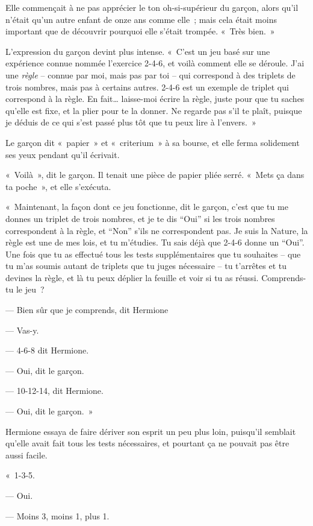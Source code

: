 Elle commençait à ne pas apprécier le ton oh-si-supérieur du garçon, alors qu'il n'était qu'un autre enfant de onze ans comme elle~; mais cela était moins important que de découvrir pourquoi elle s'était trompée. «~Très bien.~»

L'expression du garçon devint plus intense. «~C'est un jeu basé sur une expérience connue nommée l'exercice 2-4-6, et voilà comment elle se déroule. J'ai une \emph{règle} -- connue par moi, mais pas par toi -- qui correspond à des triplets de trois nombres, mais pas à certains autres. 2-4-6 est un exemple de triplet qui correspond à la règle. En fait… laisse-moi écrire la règle, juste pour que tu saches qu'elle est fixe, et la plier pour te la donner. Ne regarde pas s'il te plaît, puisque je déduis de ce qui s'est passé plus tôt que tu peux lire à l'envers.~»

Le garçon dit «~papier~» et «~criterium~» à sa bourse, et elle ferma solidement ses yeux pendant qu'il écrivait.

«~Voilà~», dit le garçon. Il tenait une pièce de papier pliée serré. «~Mets ça dans ta poche~», et elle s'exécuta.

«~Maintenant, la façon dont ce jeu fonctionne, dit le garçon, c'est que tu me donnes un triplet de trois nombres, et je te dis “Oui” si les trois nombres correspondent à la règle, et “Non” s'ils ne correspondent pas. Je suis la Nature, la règle est une de mes lois, et tu m'étudies. Tu sais déjà que 2-4-6 donne un “Oui”. Une fois que tu as effectué tous les tests supplémentaires que tu souhaites -- que tu m'as soumis autant de triplets que tu juges nécessaire -- tu t'arrêtes et tu devines la règle, et là tu peux déplier la feuille et voir si tu as réussi. Comprends-tu le jeu~?

--- Bien sûr que je comprends, dit Hermione

--- Vas-y.

--- 4-6-8 dit Hermione.

--- Oui, dit le garçon.

--- 10-12-14, dit Hermione.

--- Oui, dit le garçon.~»

Hermione essaya de faire dériver son esprit un peu plus loin, puisqu'il semblait qu'elle avait fait tous les tests nécessaires, et pourtant ça ne pouvait pas être aussi facile.

«~1-3-5.

--- Oui.

--- Moins 3, moins 1, plus 1.

